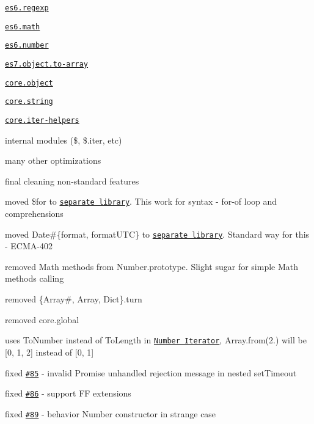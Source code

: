 \begin{DoxyItemize}
\begin{DoxyItemize}
\item \href{https://github.com/zloirock/core-js/#ecmascript-6-regexp}{\tt {\ttfamily es6.\+regexp}}
\item \href{https://github.com/zloirock/core-js/#ecmascript-6-math}{\tt {\ttfamily es6.\+math}}
\item \href{https://github.com/zloirock/core-js/#ecmascript-6-number}{\tt {\ttfamily es6.\+number}}
\item \href{https://github.com/zloirock/core-js/#ecmascript-7-proposals}{\tt {\ttfamily es7.\+object.\+to-\/array}}
\item \href{https://github.com/zloirock/core-js/#object}{\tt {\ttfamily core.\+object}}
\item \href{https://github.com/zloirock/core-js/#escaping-strings}{\tt {\ttfamily core.\+string}}
\item \href{https://github.com/zloirock/core-js/#ecmascript-6-iterators}{\tt {\ttfamily core.\+iter-\/helpers}}
\item internal modules ({\ttfamily \$}, {\ttfamily \$.iter}, etc)
\end{DoxyItemize}
\item many other optimizations
\item final cleaning non-\/standard features
\begin{DoxyItemize}
\item moved {\ttfamily \$for} to \href{https://github.com/zloirock/forof}{\tt separate library}. This work for syntax -\/ {\ttfamily for-\/of} loop and comprehensions
\item moved {\ttfamily Date\#\{format, format\+U\+TC\}} to \href{https://github.com/zloirock/dtf}{\tt separate library}. Standard way for this -\/ {\ttfamily E\+C\+M\+A-\/402}
\item removed {\ttfamily Math} methods from {\ttfamily Number.\+prototype}. Slight sugar for simple {\ttfamily Math} methods calling
\item removed {\ttfamily \{Array\#, Array, Dict\}.turn}
\item removed {\ttfamily core.\+global}
\end{DoxyItemize}
\item uses {\ttfamily To\+Number} instead of {\ttfamily To\+Length} in \href{https://github.com/zloirock/core-js/#number-iterator}{\tt {\ttfamily Number Iterator}}, {\ttfamily Array.\+from(2.)} will be {\ttfamily \mbox{[}0, 1, 2\mbox{]}} instead of {\ttfamily \mbox{[}0, 1\mbox{]}}
\item fixed \href{https://github.com/zloirock/core-js/issues/85}{\tt \#85} -\/ invalid {\ttfamily Promise} unhandled rejection message in nested {\ttfamily set\+Timeout}
\item fixed \href{https://github.com/zloirock/core-js/issues/86}{\tt \#86} -\/ support FF extensions
\item fixed \href{https://github.com/zloirock/core-js/issues/89}{\tt \#89} -\/ behavior {\ttfamily Number} constructor in strange case
\end{DoxyItemize}

